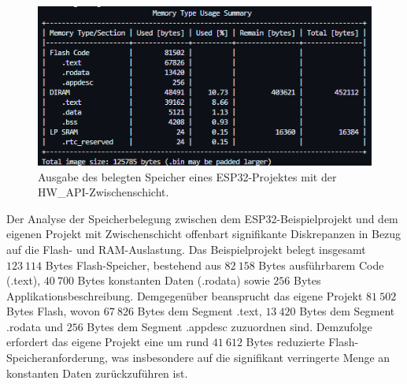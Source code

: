 \begin{figure}[H]
	\includegraphics[width=\textwidth]{Pics/esp32c6_hw_api_debug_size_detail.png}
	\caption{Ausgabe des belegten Speicher eines ESP32-Projektes mit der HW\_API-Zwischenschicht.}
	\label{fig:esp32_hw_api_size}
\end{figure}

%
Der Analyse der Speicherbelegung zwischen dem ESP32-Beispielprojekt und dem eigenen Projekt mit Zwischenschicht offenbart signifikante Diskrepanzen in Bezug auf die Flash- und RAM-Auslastung. 
Das Beispielprojekt belegt insgesamt $123\ 114$ Bytes Flash-Speicher, bestehend aus $82\ 158$ Bytes ausführbarem Code (.text), $40\ 700$ Bytes konstanten Daten (.rodata) sowie $256$ Bytes Applikationsbeschreibung. 
Demgegenüber beansprucht das eigene Projekt $81\ 502$ Bytes Flash, wovon $67\ 826$ Bytes dem Segment .text, $13\ 420$ Bytes dem Segment .rodata und $256$ Bytes dem Segment .appdesc zuzuordnen sind. 
Demzufolge erfordert das eigene Projekt eine um rund $41\ 612$ Bytes reduzierte Flash-Speicheranforderung, was insbesondere auf die signifikant verringerte Menge an konstanten Daten zurückzuführen ist.

